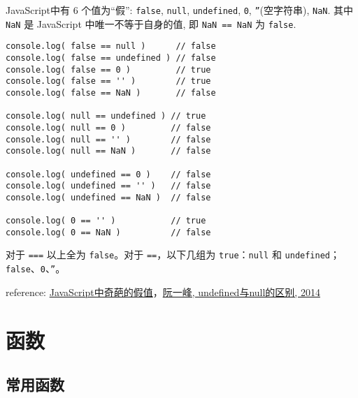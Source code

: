 JavaScript中有 6 个值为“假”: \texttt{false}, \texttt{null}, \texttt{undefined}, \texttt{0}, \texttt{''}(空字符串), \texttt{NaN}. 其中 \texttt{NaN} 是 JavaScript 中唯一不等于自身的值, 即 \texttt{NaN == NaN} 为 \texttt{false}.

\begin{verbatim}console.log( false == null )      // false
console.log( false == undefined ) // false
console.log( false == 0 )         // true
console.log( false == '' )        // true
console.log( false == NaN )       // false

console.log( null == undefined ) // true
console.log( null == 0 )         // false
console.log( null == '' )        // false
console.log( null == NaN )       // false

console.log( undefined == 0 )    // false
console.log( undefined == '' )   // false
console.log( undefined == NaN )  // false

console.log( 0 == '' )           // true
console.log( 0 == NaN )          // false
\end{verbatim}

对于 \texttt{===} 以上全为 \texttt{false}。对于 \texttt{==}，以下几组为 \texttt{true}：\texttt{null} 和 \texttt{undefined}；\texttt{false}、\texttt{0}、\texttt{''}。

reference: \href{http://www.cnblogs.com/snandy/p/3589517.html}{JavaScript中奇葩的假值}，\href{http://www.ruanyifeng.com/blog/2014/03/undefined-vs-null.html}{阮一峰, undefined与null的区别, 2014}

\section{函数}\hypertarget{section-2}{}\label{section-2}

\subsection{常用函数}\hypertarget{section-3}{}\label{section-3}


